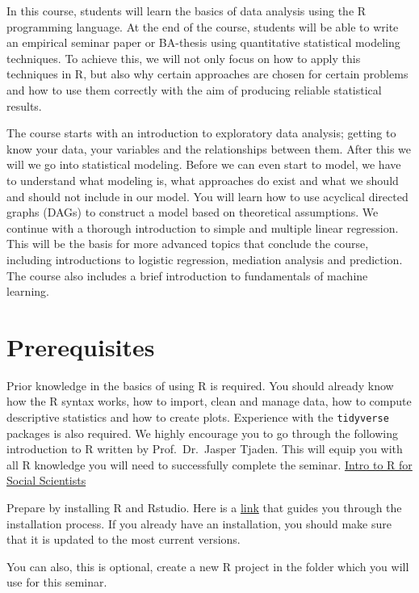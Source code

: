 \documentclass[
]{book}
\begin{document}
In this course, students will learn the basics of data analysis using the R programming language. At the end of the course, students will be able to write an empirical seminar paper or BA-thesis using quantitative statistical modeling techniques. To achieve this, we will not only focus on how to apply this techniques in R, but also why certain approaches are chosen for certain problems and how to use them correctly with the aim of producing reliable statistical results.

The course starts with an introduction to exploratory data analysis; getting to know your data, your variables and the relationships between them. After this we will we go into statistical modeling. Before we can even start to model, we have to understand what modeling is, what approaches do exist and what we should and should not include in our model. You will learn how to use acyclical directed graphs (DAGs) to construct a model based on theoretical assumptions. We continue with a thorough introduction to simple and multiple linear regression. This will be the basis for more advanced topics that conclude the course, including introductions to logistic regression, mediation analysis and prediction. The course also includes a brief introduction to fundamentals of machine learning.

\hypertarget{prerequisites}{%
\section{Prerequisites}\label{prerequisites}}

Prior knowledge in the basics of using R is required. You should already know how the R syntax works, how to import, clean and manage data, how to compute descriptive statistics and how to create plots. Experience with the \texttt{tidyverse} packages is also required.
We highly encourage you to go through the following introduction to R written by Prof.~Dr.~Jasper Tjaden. This will equip you with all R knowledge you will need to successfully complete the seminar.
\href{https://jaspertjaden.github.io/course-intro2r/}{Intro to R for Social Scientists}

Prepare by installing R and Rstudio. Here is a \href{https://rstudio-education.github.io/hopr/starting.html}{link} that guides you through the installation process. If you already have an installation, you should make sure that it is updated to the most current versions.

You can also, this is optional, create a new R project in the folder which you will use for this seminar.
\end{document}

